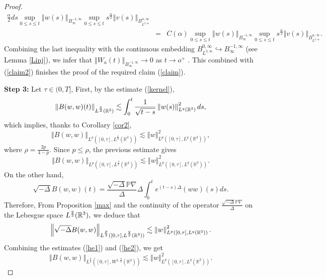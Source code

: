 \documentclass[10pt,a4paper]{amsart}
\begin{document}
\begin{proof}
\begin{eqnarray*}
{{\frac{\alpha }{2}}}ds\sup_{0\leq s\leq t}\left\Vert
w(s)\right\Vert _{B_{\infty }^{-1,\infty }} \sup_{0\leq s\leq t}s^{\frac{\alpha }{2}}\left\Vert v(s)\right\Vert
_{B_{L^{3,\infty }}^{\alpha ,\infty }}\\
&=&C(\alpha ) \sup_{0\leq s\leq t}\left\Vert w(s)\right\Vert
_{B_{\infty }^{-1,\infty }}\sup_{0\leq s\leq t}s^{\frac{\alpha }{2}}\left\Vert v(s)\right\Vert _{B_{L^{3,\infty
}}^{\alpha ,\infty }}.
\end{eqnarray*}%
Combining the last inequality with the continuous embedding $B_{L^{3,\infty }}^{0,\infty }\hookrightarrow
B_{\infty }^{-1,\infty }$ (see Lemma \ref{Linj}),  we infer that $\left\Vert W_a(t)\right\Vert_{B_{\infty }^{-1,\infty }}\to 0$ as $t\to o^+$ . This combined with (\ref{claim2}) finishes the proof of the required claim (\ref{claim}).
\par\noindent\textbf{Step 3:}
Let $\tau \in (0,T]$, First, by the estimate (\ref{kernel}),
\[
\left\Vert B(w,w)(t)\right\Vert_{
L^{\frac{q}{2}}(\mathbb{R}^{3})}\lesssim \int_{0}^{t}\frac{1}{%
\sqrt{t-s}}\left\Vert w(s)\right\Vert_{L^{q}(\mathbb{R}^{3})}^2ds,
\]%
which implies, thanks to Corollary \ref{cor2},
\[
\left\Vert B(w,w)\right\Vert _{L^\rho([0,\tau ],L^{\frac{q}{2}}(%
\mathbb{R}^{3}))}\lesssim \left\Vert w\right\Vert
_{L^{p}([0,\tau ],L^{q}(\mathbb{R}^{3}))}^{2},
\]%
where $\rho =\frac{2p}{4-p}.$ Since $p\leq\rho$,
the previous estimate gives
\begin{equation}\label{he1}
\left\Vert B(w,w)\right\Vert _{L^p([0,\tau ],L^{\frac{q}{2}}(%
\mathbb{R}^{3}))}\lesssim \left\Vert w\right\Vert
_{L^{p}([0,\tau ],L^{q}(\mathbb{R}^{3}))}^{2}.
\end{equation}
On the other hand,
\[
\sqrt{-\Delta } B(w,w)(t)=\frac{\sqrt{-\Delta }\mathbb{P}\nabla }{\Delta } \Delta \int_{0}^{t} e^{(t-s)\Delta }(w w)(s)ds.
\]
Therefore, From Proposition \ref{max} and the continuity of the operator $%
\frac{\sqrt{-\Delta }\mathbb{P}\nabla }{\Delta }$ on the Lebesgue space $L^{%
\frac{q}{2}}(\mathbb{R}^{3}),$ we deduce that
\begin{equation}\label{he2}
\left\Vert \sqrt{-\Delta }B(w,w)\right\Vert _{L^{\frac{p}{2}}([0,\tau ],L^{%
\frac{q}{2}}(\mathbb{R}^{3}))}\lesssim \left\Vert w\right\Vert
_{L^{p}([0,\tau ],L^{q}(\mathbb{R}^{3}))}^{2}.
\end{equation}
Combining the estimates (\ref{he1}) and (\ref{he2}), we get
\[
\left\Vert B(w,w)\right\Vert _{L^{\frac{p}{2}}([0,\tau ],W^{1,\frac{q}{2}}(%
\mathbb{R}^{3}))}\lesssim \left\Vert w\right\Vert _{L^{p}([0,\tau ],L^{q}(%
\mathbb{R}^{3}))}^{2}.
\]
\end{proof}
\end{document}
